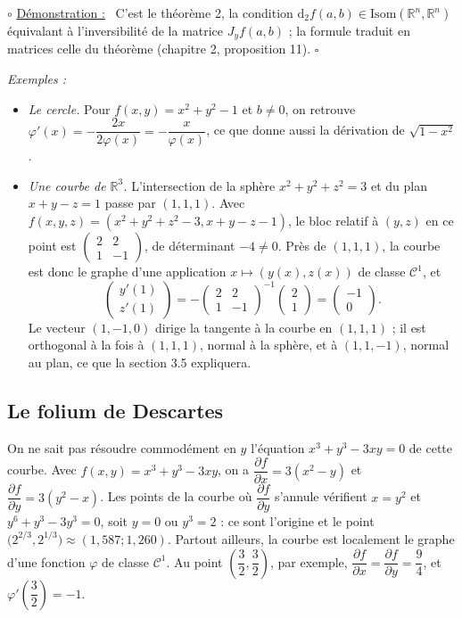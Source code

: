 \documentclass[a4paper,twoside]{report}
\newenvironment{demo}%
 {\par\needspace{4\baselineskip}\vspace{1mm}\noindent$\circ$ \underline{Démonstration :}~\setlength{\parskip}{3pt plus 1pt}}%
 {\hfill$\square$\par\vspace{2mm}}
\newenvironment{exemples}%
 {\par\needspace{6\baselineskip}\vspace{1mm}\begin{list}{}{\leftmargin=1cm \rightmargin=0.5cm}\item[]%
  \textit{Exemples :}%
  \begin{itemize}[label=$\bullet$,leftmargin=0.45cm,topsep=3pt,itemsep=4pt]}%
 {\end{itemize}\end{list}\vspace{1mm}}
\newcommand{\R}{\mathbb{R}}
\newcommand{\dd}{\mathrm{d}}                      %
\newcommand{\Cc}{\mathcal{C}}                     %
\newcommand{\dpd}[2]{\dfrac{\partial #1}{\partial #2}}  %
\newcommand{\Isom}{\mathrm{Isom}}                 %
\newcommand{\Jac}{J}                              %
\begin{document}
\begin{demo}
C'est le théorème 2, la condition $\dd_{2} f(a, b) \in \Isom(\R^{n}, \R^{n})$ équivalant à l'inversibilité de la matrice $\Jac_{y} f(a, b)$ ; la formule traduit en matrices celle du théorème (chapitre 2, proposition 11).
\end{demo}

\begin{exemples}
  \item \emph{Le cercle.} Pour $f(x, y) = x^{2} + y^{2} - 1$ et $b \neq 0$, on retrouve $\varphi'(x) = -\dfrac{2x}{2\varphi(x)} = -\dfrac{x}{\varphi(x)}$, ce que donne aussi la dérivation de $\sqrt{1 - x^{2}}$.
  \item \emph{Une courbe de $\R^{3}$.} L'intersection de la sphère $x^{2} + y^{2} + z^{2} = 3$ et du plan $x + y - z = 1$ passe par $(1, 1, 1)$. Avec $f(x, y, z) = (x^{2} + y^{2} + z^{2} - 3, x + y - z - 1)$, le bloc relatif à $(y, z)$ en ce point est $\begin{pmatrix} 2 & 2 \\ 1 & -1 \end{pmatrix}$, de déterminant $-4 \neq 0$. Près de $(1, 1, 1)$, la courbe est donc le graphe d'une application $x \mapsto (y(x), z(x))$ de classe $\Cc^{1}$, et
  \[ \begin{pmatrix} y'(1) \\ z'(1) \end{pmatrix} = -\begin{pmatrix} 2 & 2 \\ 1 & -1 \end{pmatrix}^{-1}\begin{pmatrix} 2 \\ 1 \end{pmatrix} = \begin{pmatrix} -1 \\ 0 \end{pmatrix}. \]
  Le vecteur $(1, -1, 0)$ dirige la tangente à la courbe en $(1, 1, 1)$ ; il est orthogonal à la fois à $(1, 1, 1)$, normal à la sphère, et à $(1, 1, -1)$, normal au plan, ce que la section 3.5 expliquera.
\end{exemples}

\subsection{Le folium de Descartes}

On ne sait pas résoudre commodément en $y$ l'équation $x^{3} + y^{3} - 3xy = 0$ de cette courbe. Avec $f(x, y) = x^{3} + y^{3} - 3xy$, on a $\dpd{f}{x} = 3(x^{2} - y)$ et $\dpd{f}{y} = 3(y^{2} - x)$. Les points de la courbe où $\dpd{f}{y}$ s'annule vérifient $x = y^{2}$ et $y^{6} + y^{3} - 3y^{3} = 0$, soit $y = 0$ ou $y^{3} = 2$ : ce sont l'origine et le point $\big(2^{2/3}, 2^{1/3}\big) \approx (1{,}587 ; 1{,}260)$. Partout ailleurs, la courbe est localement le graphe d'une fonction $\varphi$ de classe $\Cc^{1}$. Au point $\left(\dfrac{3}{2}, \dfrac{3}{2}\right)$, par exemple, $\dpd{f}{x} = \dpd{f}{y} = \dfrac{9}{4}$, et $\varphi'\left(\dfrac{3}{2}\right) = -1$.
\end{document}
